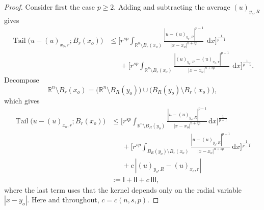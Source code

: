 \documentclass[10pt,letterpaper]{amsart}
\theoremstyle{definition}
\numberwithin{theorem}{section}
\numberwithin{equation}{section}
\newcommand{\1}{\ensuremath{\mathds{1}}}
\newcommand\sfI{{\boldsymbol{\mathsf I}}}
\renewcommand{\d}{\:\! \mathrm{d}}
\DeclareMathOperator{\Tail}{Tail}
\numberwithin{equation}{section}
\begin{document}
\begin{proof}
Consider first the case $p\ge 2$. Adding and subtracting the average $(u)_{y_o,R}$ gives
\begin{align*}
    \Tail \big(u-(u)_{x_o,r}; B_r(x_o)\big)
    &\le 
    \bigg[r^{sp}
    \int_{\mathbb{R}^n\setminus B_{r}(x_o)}
        \frac{|u-(u)_{y_o,R}|^{p-1}}{|x-x_o|^{n+sp}}\, \d x \bigg]^{\frac{1}{p-1}} \\
    &\phantom{\le\,}
    +
    \bigg[r^{sp}
    \int_{\mathbb{R}^n\setminus B_{r}(x_o)}
        \frac{|(u)_{y_o,R}-(u)_{x_o,r}|^{p-1}}{|x-x_o|^{n+sp}}\, \d x \bigg]^{\frac{1}{p-1}}.
\end{align*}
Decompose
\[
\mathbb{R}^n\setminus B_r(x_o)
=
\big(\mathbb{R}^n\setminus B_R(y_o)\big)
\cup
\big(B_R(y_o)\setminus B_r(x_o)\big),
\]
which gives
\begin{align*}
    \Tail\big(u-(u)_{x_o,r}; B_r(x_o)\big)
    &\le 
    \bigg[r^{sp}
    \int_{\mathbb{R}^n\setminus B_R(y_o)}
        \frac{|u-(u)_{y_o,R}|^{p-1}}{|x-x_o|^{n+sp}}\,\mathrm dx
    \bigg]^{\frac{1}{p-1}} \\
    &\phantom{\le\,} +
    \bigg[r^{sp}
    \int_{B_R(y_o)\setminus B_r(x_o)}
        \frac{|u-(u)_{y_o,R}|^{p-1}}{|x-x_o|^{n+sp}}\,\mathrm dx
    \bigg]^{\frac{1}{p-1}} \\
    &\phantom{\le\,}+
    c\, |(u)_{y_o,R}-(u)_{x_o,r}| \\
    &:= \sfI + \sfI\sfI + c\,\sfI\sfI\sfI,
\end{align*}
where the last term uses that the kernel depends only on the radial variable $|x-y_o|$. Here and throughout, \(c=c(n,s,p)\).


\end{proof}
\end{document}
